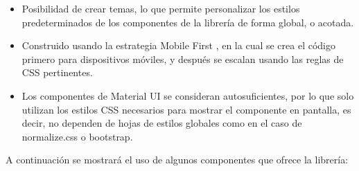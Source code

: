 \begin{itemize}
  \item Posibilidad de crear temas, lo que permite personalizar los estilos predeterminados de los componentes de la librería de forma global, o acotada.
  \item Construido usando la estrategia Mobile First \cite{MobileFirst}, en la cual se crea el código primero para dispositivos móviles, y después se escalan usando las reglas de CSS pertinentes.
  \item Los componentes de Material UI se consideran autosuficientes, por lo que solo utilizan los estilos CSS necesarios para mostrar el componente en pantalla, es decir, no dependen de hojas de estilos globales como en el caso de normalize.css o bootstrap.
\end{itemize}

A continuación se mostrará el uso de algunos componentes que ofrece la librería:

